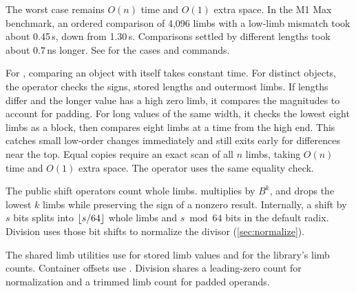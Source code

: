 The worst case remains $O(n)$ time and $O(1)$ extra space.
In the M1 Max benchmark, an ordered comparison of 4,096 limbs with a
low-limb mismatch took about 0.45\,\textmu s, down from
1.30\,\textmu s. Comparisons settled by different lengths took
about $0.7$\,ns longer. See  for the cases and commands.

For , comparing an object with itself takes constant time. For distinct
objects, the operator checks the signs, stored lengths and outermost limbs. If lengths
differ and the longer value has a high zero limb, it compares the magnitudes to account
for padding. For long values of the same width, it checks the lowest eight limbs as a
block, then compares eight limbs at a time from the high end. This catches small
low-order changes immediately and still exits early for differences near the top.
Equal copies require an exact scan of all $n$ limbs, taking $O(n)$ time and $O(1)$
extra space. The \code{!=} operator uses the same equality check.

The public shift operators count whole limbs.  multiplies
by $B^k$, and  drops the lowest $k$ limbs while preserving
the sign of a nonzero result. Internally, a shift by $s$ bits splits into
$\left\lfloor s/64 \right\rfloor$ whole limbs and $s\bmod 64$ bits in the default radix.
Division uses those bit shifts to normalize the divisor
(\cref{sec:normalize}).

The shared limb utilities use  for stored limb values and
 for the library's limb counts. Container offsets use
. Division shares a leading-zero count for
normalization and a trimmed limb count for padded operands.
